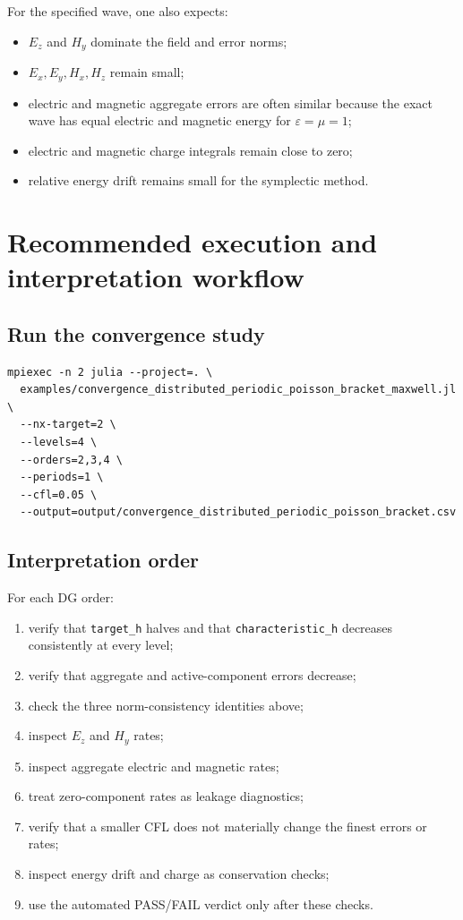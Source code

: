 \documentclass[11pt]{article}
\newcommand{\code}[1]{\nolinkurl{#1}}
\begin{document}
For the specified wave, one also expects:
\begin{itemize}[leftmargin=*]
  \item \(E_z\) and \(H_y\) dominate the field and error norms;
  \item \(E_x,E_y,H_x,H_z\) remain small;
  \item electric and magnetic aggregate errors are often similar because the
        exact wave has equal electric and magnetic energy for
        \(\varepsilon=\mu=1\);
  \item electric and magnetic charge integrals remain close to zero;
  \item relative energy drift remains small for the symplectic method.
\end{itemize}

\section{Recommended execution and interpretation workflow}

\subsection{Run the convergence study}

\begin{lstlisting}[style=shell]
mpiexec -n 2 julia --project=. \
  examples/convergence_distributed_periodic_poisson_bracket_maxwell.jl \
  --nx-target=2 \
  --levels=4 \
  --orders=2,3,4 \
  --periods=1 \
  --cfl=0.05 \
  --output=output/convergence_distributed_periodic_poisson_bracket.csv
\end{lstlisting}

\subsection{Interpretation order}

For each DG order:
\begin{enumerate}[leftmargin=*]
  \item verify that \code{target_h} halves and that
        \code{characteristic_h} decreases consistently at every level;
  \item verify that aggregate and active-component errors decrease;
  \item check the three norm-consistency identities above;
  \item inspect \(E_z\) and \(H_y\) rates;
  \item inspect aggregate electric and magnetic rates;
  \item treat zero-component rates as leakage diagnostics;
  \item verify that a smaller CFL does not materially change the finest
        errors or rates;
  \item inspect energy drift and charge as conservation checks;
  \item use the automated PASS/FAIL verdict only after these checks.
\end{enumerate}
\end{document}
